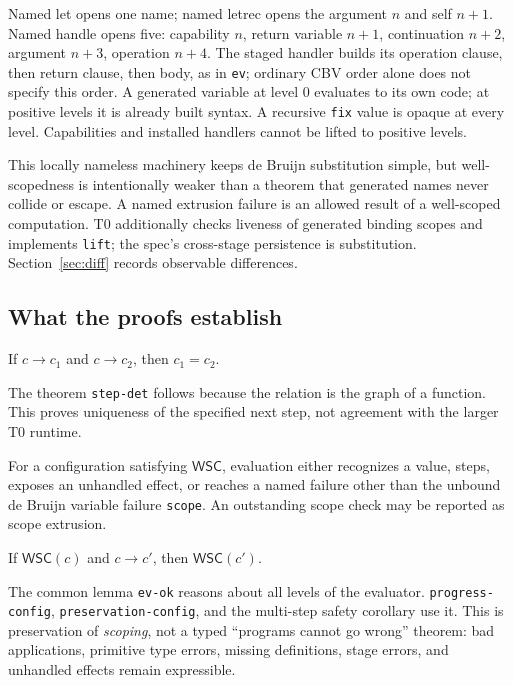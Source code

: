 \documentclass[acmsmall,screen,review,nonacm]{acmart}
\newcommand{\kw}[1]{\mathsf{#1}}
\newcommand{\step}{\longrightarrow}
\newcommand{\WSC}{\kw{WSC}}
\newcommand{\src}[1]{{\normalfont\nolinkurl{#1}}}
\begin{document}
Named let opens one name; named letrec opens the argument $n$ and self $n+1$.
Named handle opens five: capability $n$, return variable $n+1$, continuation
$n+2$, argument $n+3$, operation $n+4$. The staged handler builds its operation
clause, then return clause, then body, as in \src{ev}; ordinary CBV order
alone does not specify this order. A generated variable at level 0 evaluates
to its own code; at positive levels it is already built syntax. A recursive
\src{fix} value is opaque at every level. Capabilities and installed handlers
cannot be lifted to positive levels.

This locally nameless machinery keeps de Bruijn substitution simple, but
well-scopedness is intentionally weaker than a theorem that generated names
never collide or escape. A named extrusion failure is an allowed result of a
well-scoped computation. T0 additionally checks liveness of generated binding
scopes and implements \src{lift}; the spec's cross-stage persistence is
substitution. Section~\ref{sec:diff} records observable differences.

\subsection{What the proofs establish}\label{sec:proofs}
\begin{theorem}
If $c\step c_1$ and $c\step c_2$, then $c_1=c_2$.
\end{theorem}
The theorem \src{step-det} follows because the relation is the graph of a
function. This proves uniqueness of the specified next step, not agreement
with the larger T0 runtime.
\begin{theorem}
For a configuration satisfying $\WSC$, evaluation either recognizes a value,
steps, exposes an unhandled effect, or reaches a named failure other than the
unbound de Bruijn variable failure \src{scope}. An outstanding scope check may
be reported as scope extrusion.
\end{theorem}
\begin{theorem}
If $\WSC(c)$ and $c\step c'$, then $\WSC(c')$.
\end{theorem}
The common lemma \src{ev-ok} reasons about all levels of the evaluator.
\src{progress-config}, \src{preservation-config}, and the multi-step safety
corollary use it. This is preservation of \emph{scoping}, not a typed
``programs cannot go wrong'' theorem: bad applications, primitive type errors,
missing definitions, stage errors, and unhandled effects remain expressible.
\end{document}
